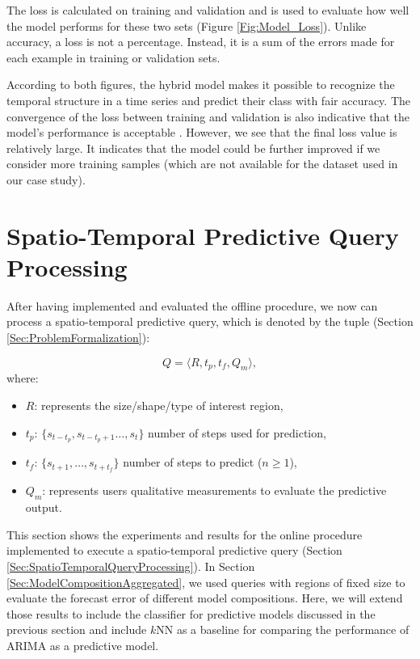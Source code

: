 The loss is calculated on training and validation and is used to evaluate how well the model performs for these two sets (Figure \ref{Fig:Model_Loss}). Unlike accuracy, a loss is not a percentage. Instead, it is a sum of the errors made for each example in training or validation sets.

According to both figures, the hybrid model makes it possible to recognize the temporal structure in a time series and predict their class with fair accuracy. The convergence of the loss between training and validation is also indicative that the model's performance is acceptable \cite{Charniak2019}. However, we see that the final loss value is relatively large. It indicates that the model could be further improved if we consider more training samples (which are not available for the dataset used in our case study).

\section{Spatio-Temporal Predictive Query Processing}
\label{Sec:SpatioTemporalPredictiveQuery}

After having implemented and evaluated the offline procedure, we now can process a spatio-temporal predictive query, which is denoted by the tuple (Section \ref{Sec:ProblemFormalization}):

\begin{equation*} 
Q = \langle R, t_{p}, t_{f}, Q_{m} \rangle,
\end{equation*}
where:
\begin{itemize}[noitemsep,nolistsep]	
	\item $R$: represents the size/shape/type of interest region,
	\item $t_{p}$: $\{s_{t-t_p}, s_{t-t_{p}+1}\ldots, s_{t}\}$ number of steps used for  prediction,
	\item $t_{f}$: $\{s_{t+1}, \ldots, s_{t+t_f}\}$ number of steps to predict ($n\geq 1$),
	\item $Q_{m}$: represents users qualitative measurements to evaluate the predictive output.
\end{itemize}

This section shows the experiments and results for the online procedure implemented to execute a spatio-temporal predictive query (Section \ref{Sec:SpatioTemporalQueryProcessing}). In Section \ref{Sec:ModelCompositionAggregated}, we used queries with regions of fixed size to evaluate the forecast error of different model compositions. Here, we will extend those results to include the classifier for predictive models discussed in the previous section and include $k$NN as a baseline for comparing the performance of ARIMA as a predictive model.

